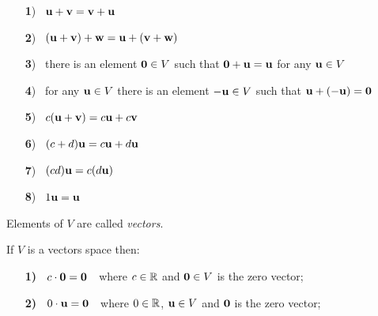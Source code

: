 {\begin{cbox}[Definition]
\vskip 5mm
 
\begin{itemize}
\item[{\textbf 1)\ }] ${\bf u}+{\bf v} = {\bf v}+{\bf u}$

\vskip 3mm

\item[{\textbf 2)\ }] $({\bf u} +{\bf v}) +{\bf w} = {\bf u} + ({\bf v} +{\bf w} )$ 

\vskip 3mm

\item[{\textbf 3)\ }] there is an element ${\bf 0}\in V$ such that ${\bf 0} +{\bf u} = {\bf u}$
for any ${\bf u}\in V$

\vskip 3mm

\item[{\textbf 4)\ }] for any ${\bf u}\in V$ there is an element $-{\bf u} \in V$ such that 
${\bf u} + (-{\bf u})={\bf 0}$

\vskip 3mm

\item[{\textbf 5)\ }] $c ({\bf u}+{\bf v}) = c{\bf u} + c{\bf v}$

\vskip 3mm

\item[{\textbf 6)\ }] $(c+d){\bf u} = c{\bf u} + d{\bf u}$

\vskip 3mm

\item[{\textbf 7)\ }] $(cd){\bf u} = c(d{\bf u})$

\vskip 3mm

\item[{\textbf 8)\ }] $1{\bf u} = {\bf u}$

\end{itemize}

\vskip 5mm

Elements of $V$ are called \emph{vectors}.

\end{cbox}

\newpage

\begin{cbox}[Theorem]
If $V$ is a vectors space then:
\begin{itemize}
\item[\textbf{1)\ }] $c\cdot {\bf 0} = {\bf 0}$\ \  where $c\in {\mathbb R}$ and ${\bf 0} \in V$ is the zero vector;

\vskip 3mm

\item[\textbf{2)\ }] $0\cdot {\bf u} = {\bf 0}$\ \  where $0\in {\mathbb R}$, ${\bf u}\in V$ and ${\bf 0}$ is the zero vector;  

\vskip 3mm


\end{itemize}
\end{cbox}}
